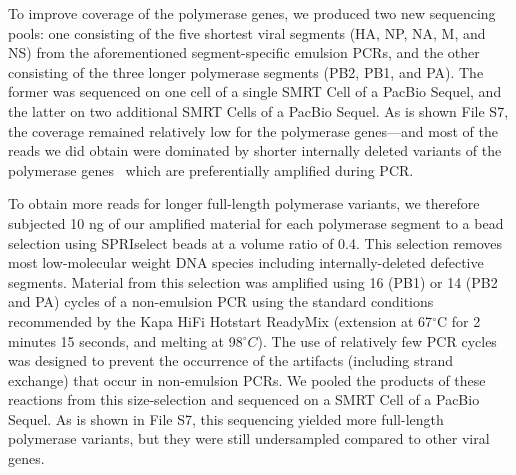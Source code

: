\documentclass[]{article}
\begin{document}
To improve coverage of the polymerase genes, we produced two new sequencing pools: one consisting of the five shortest viral segments (HA, NP, NA, M, and NS) from the aforementioned segment-specific emulsion PCRs, and the other consisting of the three longer polymerase segments (PB2, PB1, and PA).
The former was sequenced on one cell of a single SMRT Cell of a PacBio Sequel, and the latter on two additional SMRT Cells of a PacBio Sequel. 
As is shown File S7, the coverage remained relatively low for the polymerase genes---and most of the reads we did obtain were dominated by shorter internally deleted variants of the polymerase genes~\cite{xue2016propagation} which are preferentially amplified during PCR.

To obtain more reads for longer full-length polymerase variants, we therefore subjected 10 ng of our amplified material for each polymerase segment to a bead selection using SPRIselect beads at a volume ratio of 0.4. 
This selection removes most low-molecular weight DNA species including internally-deleted defective segments.
Material from this selection was amplified using 16 (PB1) or 14 (PB2 and PA) cycles of a non-emulsion PCR using the standard conditions recommended by the Kapa HiFi Hotstart ReadyMix (extension at 67$^{\circ}$C for 2 minutes 15 seconds, and melting at 98$^{\circ}C$).
The use of relatively few PCR cycles was designed to prevent the occurrence of the artifacts (including strand exchange) that occur in non-emulsion PCRs.
We pooled the products of these reactions from this size-selection and sequenced on a SMRT Cell of a PacBio Sequel.
As is shown in File S7, this sequencing yielded more full-length polymerase variants, but they were still undersampled compared to other viral genes.
\end{document}
